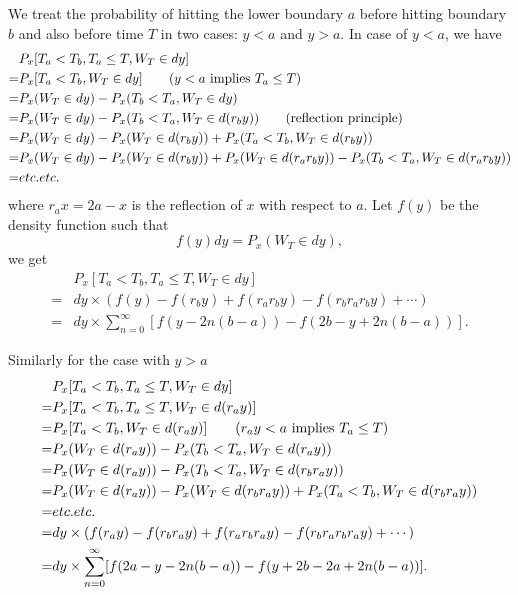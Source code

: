 We treat the probability of hitting the lower boundary $a$ before hitting
boundary $b$ and also before time $T$ in two cases: $y<a$ and $y>a$.
In case of $y<a$, we have
\begin{align*}
	&P_x[T_a<T_b, T_a\le T, W_T\in dy]  \notag \\
	=&  P_x[T_a<T_b, W_T\in dy]   \qquad \text{($y<a$ implies $T_a\le T$)}
	    \notag \\
  =& P_x(W_T\in dy) - P_x(T_b<T_a, W_T\in dy)   \notag \\
	=& P_x(W_T\in dy) - P_x(T_b<T_a, W_T\in d(r_b y)) 
			\qquad \text{(reflection principle)}  \notag \\
	=& P_x(W_T\in dy) - P_x(W_T\in d(r_b y)) + P_x(T_a<T_b, W_T\in d(r_b y))
			\notag \\
	=& P_x(W_T\in dy) - P_x(W_T\in d(r_b y)) + P_x(W_T\in d(r_a r_b y))  
			- P_x(T_b<T_a, W_T\in d(r_a r_b y)) \notag \\
  =& etc.etc.   \notag \\
\end{align*}
where $r_a x = 2a-x$ is the reflection of $x$ with respect to $a$.
Let $f(y)$ be the density function such that
\begin{equation}
	f(y) dy = P_x(W_T\in dy), 
\end{equation}
we get
\begin{align*}
	 & P_x[T_a<T_b, T_a\le T, W_T\in dy]   \\
  =& dy\times (f(y) - f(r_b y) + f(r_a r_b y) - f(r_b r_a r_b y)
		 + \cdots) \\
	=& dy\times\sum_{n=0}^{\infty} [ f(y-2n(b-a)) - f(2b-y+2n(b-a)) ].
\end{align*}

Similarly for the case with $y>a$
\begin{align*}
	&P_x[T_a<T_b, T_a\le T, W_T\in dy]  \notag \\
	=& P_x[T_a<T_b, T_a\le T, W_T\in d(r_a y)]  \notag \\
	=& P_x[T_a<T_b, W_T\in d(r_a y)]  \qquad \text{($r_a y<a$ implies $T_a\le T$)} 
	   \notag \\
  =& P_x(W_T\in d(r_a y)) - P_x(T_b<T_a, W_T\in d(r_a y)) \notag \\
  =& P_x(W_T\in d(r_a y)) - P_x(T_b<T_a, W_T\in d(r_b r_a y)) \notag \\
  =& P_x(W_T\in d(r_a y)) - P_x(W_T\in d(r_b r_a y)) 
	   + P_x(T_a<T_b, W_T\in d(r_b r_a y)) \notag \\
	=& etc.etc. \notag \\
  =& dy\times (f(r_a y) - f(r_b r_a y) + f(r_a r_b r_a y) - f(r_b r_a r_b r_a y)
		 + \cdots) \\
  =& dy\times\sum_{n=0}^{\infty} [ f(2a-y-2n(b-a)) - f(y+2b-2a + 2n(b-a)) ].
\end{align*}

